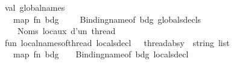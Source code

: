 \begin{isabellebody}
\ \ \ \ \ \ \ \ val\ global{\isacharunderscore}{\kern0pt}names\ {\isacharequal}{\kern0pt}\isanewline
\ \ \ \ \ \ \ \ \ \ map\ {\isacharparenleft}{\kern0pt}fn\ {\isacharparenleft}{\kern0pt}bdg{\isacharcomma}{\kern0pt}\ {\isacharunderscore}{\kern0pt}{\isacharcomma}{\kern0pt}\ {\isacharunderscore}{\kern0pt}{\isacharcomma}{\kern0pt}\ {\isacharunderscore}{\kern0pt}{\isacharparenright}{\kern0pt}\ {\isacharequal}{\kern0pt}{\isachargreater}{\kern0pt}\ Binding{\isachardot}{\kern0pt}name{\isacharunderscore}{\kern0pt}of\ bdg{\isacharparenright}{\kern0pt}\ globals{\isacharunderscore}{\kern0pt}decls\isanewline
\ \ \ \ \isanewline
\ \ \ \ \ \ \ \ {\isacharparenleft}{\kern0pt}{\isacharasterisk}{\kern0pt}\ {\isacharminus}{\kern0pt}{\isacharminus}{\kern0pt}{\isacharminus}{\kern0pt}{\isacharminus}{\kern0pt}{\isacharminus}{\kern0pt}{\isacharminus}{\kern0pt}{\isacharminus}{\kern0pt}{\isacharminus}{\kern0pt}{\isacharminus}{\kern0pt}{\isacharminus}{\kern0pt}{\isacharminus}{\kern0pt}{\isacharminus}{\kern0pt}{\isacharminus}{\kern0pt}{\isacharminus}{\kern0pt}{\isacharminus}{\kern0pt}{\isacharminus}{\kern0pt}{\isacharminus}{\kern0pt}{\isacharminus}{\kern0pt}\ {}{\isachardot}{\kern0pt}\ Noms\ locaux\ d’un\ thread\ {\isacharminus}{\kern0pt}{\isacharminus}{\kern0pt}{\isacharminus}{\kern0pt}{\isacharminus}{\kern0pt}{\isacharminus}{\kern0pt}{\isacharminus}{\kern0pt}{\isacharminus}{\kern0pt}{\isacharminus}{\kern0pt}{\isacharminus}{\kern0pt}{\isacharminus}{\kern0pt}{\isacharminus}{\kern0pt}{\isacharminus}{\kern0pt}{\isacharminus}{\kern0pt}{\isacharminus}{\kern0pt}{\isacharminus}{\kern0pt}{\isacharminus}{\kern0pt}{\isacharminus}{\kern0pt}{\isacharminus}{\kern0pt}\ {\isacharasterisk}{\kern0pt}{\isacharparenright}{\kern0pt}\isanewline
\ \ \ \ \ \ \ \ fun\ local{\isacharunderscore}{\kern0pt}names{\isacharunderscore}{\kern0pt}of{\isacharunderscore}{\kern0pt}thread\ {\isacharparenleft}{\kern0pt}{\isacharbraceleft}{\kern0pt}locals{\isacharunderscore}{\kern0pt}decl{\isacharcomma}{\kern0pt}\ {\isachardot}{\kern0pt}{\isachardot}{\kern0pt}{\isachardot}{\kern0pt}{\isacharbraceright}{\kern0pt}\ {\isacharcolon}{\kern0pt}\ thread{\isacharunderscore}{\kern0pt}absy{\isacharparenright}{\kern0pt}\ {\isacharcolon}{\kern0pt}\ string\ list\ {\isacharequal}{\kern0pt}\isanewline
\ \ \ \ \ \ \ \ \ \ map\ {\isacharparenleft}{\kern0pt}fn\ {\isacharparenleft}{\kern0pt}{\isacharparenleft}{\kern0pt}bdg{\isacharcomma}{\kern0pt}\ {\isacharunderscore}{\kern0pt}{\isacharparenright}{\kern0pt}{\isacharcomma}{\kern0pt}\ {\isacharunderscore}{\kern0pt}{\isacharparenright}{\kern0pt}\ {\isacharequal}{\kern0pt}{\isachargreater}{\kern0pt}\ Binding{\isachardot}{\kern0pt}name{\isacharunderscore}{\kern0pt}of\ bdg{\isacharparenright}{\kern0pt}\ locals{\isacharunderscore}{\kern0pt}decl\isanewline

\end{isabellebody}

